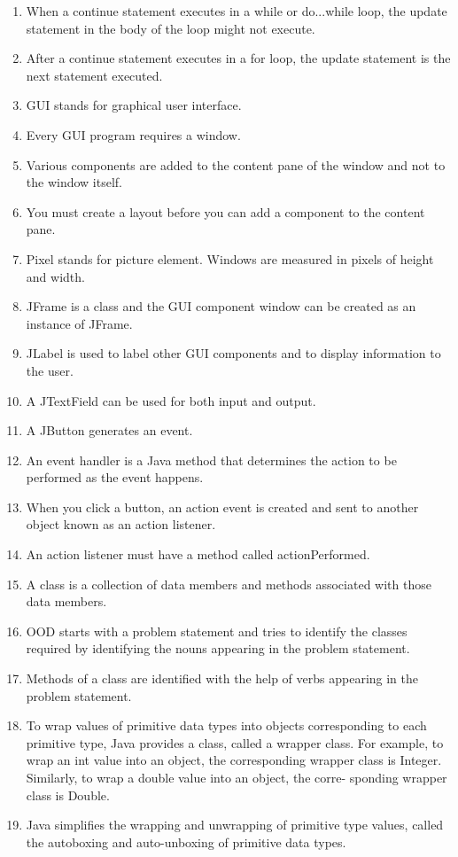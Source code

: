 \documentclass[12pt,a4paper,final,twoside,onecolumn,titlepage]{book}
\begin{document}
\begin{enumerate}
\item When a continue statement executes in a while or do...while loop, the update statement in the body of the loop might not execute.
\item After a continue statement executes in a for loop, the update statement is the next statement executed.
\item GUI stands for graphical user interface.
\item Every GUI program requires a window.
\item Various components are added to the content pane of the window and not to the window itself.
\item You must create a layout before you can add a component to the content pane.
\item Pixel stands for picture element. Windows are measured in pixels of height and width.
\item JFrame is a class and the GUI component window can be created as an instance of JFrame.
\item JLabel is used to label other GUI components and to display information to the user.
\item A JTextField can be used for both input and output.
\item A JButton generates an event.
\item An event handler is a Java method that determines the action to be performed as the event happens.
\item When you click a button, an action event is created and sent to another object known as an action listener.
\item An action listener must have a method called actionPerformed.
\item A class is a collection of data members and methods associated with those data members.
\item OOD starts with a problem statement and tries to identify the classes required by identifying the nouns appearing in the problem statement.
\item Methods of a class are identified with the help of verbs appearing in the problem statement.
\item To wrap values of primitive data types into objects corresponding to each primitive type, Java provides a class, called a wrapper class. For example, to wrap an int value into an object, the corresponding wrapper class is Integer. Similarly, to wrap a double value into an object, the corre- sponding wrapper class is Double.
\item  Java simplifies the wrapping and unwrapping of primitive type values, called the autoboxing and auto-unboxing of primitive data types.

\end{enumerate}
\end{document}
